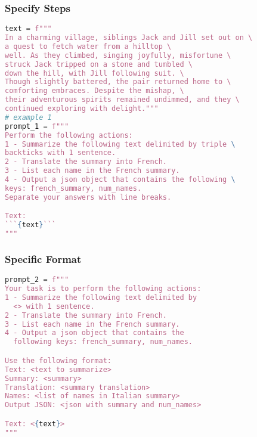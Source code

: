 		
		

\begin{frame}[fragile]\frametitle{Specify Steps}

{\tiny
\begin{lstlisting}[language=Python]
text = f"""
In a charming village, siblings Jack and Jill set out on \ 
a quest to fetch water from a hilltop \ 
well. As they climbed, singing joyfully, misfortune \ 
struck Jack tripped on a stone and tumbled \ 
down the hill, with Jill following suit. \ 
Though slightly battered, the pair returned home to \ 
comforting embraces. Despite the mishap, \ 
their adventurous spirits remained undimmed, and they \ 
continued exploring with delight."""
# example 1
prompt_1 = f"""
Perform the following actions: 
1 - Summarize the following text delimited by triple \
backticks with 1 sentence.
2 - Translate the summary into French.
3 - List each name in the French summary.
4 - Output a json object that contains the following \
keys: french_summary, num_names.
Separate your answers with line breaks.

Text:
```{text}```
"""
\end{lstlisting}

}	
		
\end{frame}

\begin{frame}[fragile]\frametitle{Specific Format}

\begin{lstlisting}[language=Python]
prompt_2 = f"""
Your task is to perform the following actions: 
1 - Summarize the following text delimited by 
  <> with 1 sentence.
2 - Translate the summary into French.
3 - List each name in the French summary.
4 - Output a json object that contains the 
  following keys: french_summary, num_names.

Use the following format:
Text: <text to summarize>
Summary: <summary>
Translation: <summary translation>
Names: <list of names in Italian summary>
Output JSON: <json with summary and num_names>

Text: <{text}>
"""
\end{lstlisting}
\end{frame}


